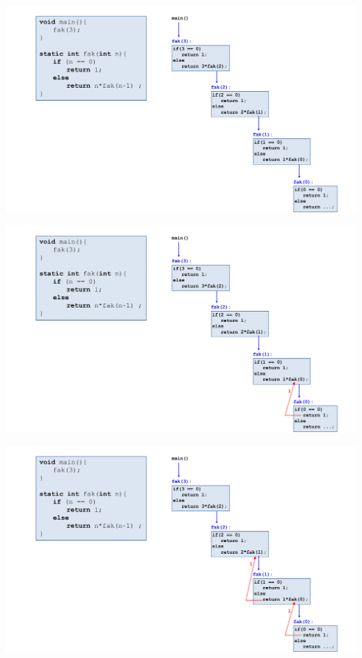 \documentclass{beamer}
\begin{document}
\begin{frame}
    \begin{center}
           \includegraphics[width=1.1\textwidth]{rekursion anlage/07_Rekursion-07.png}
    \end{center}
\end{frame}
\begin{frame}
    \begin{center}
           \includegraphics[width=1.1\textwidth]{rekursion anlage/07_Rekursion-08.png}
    \end{center}
\end{frame}
\begin{frame}
    \begin{center}
           \includegraphics[width=1.1\textwidth]{rekursion anlage/07_Rekursion-09.png}
    \end{center}
\end{frame}
\end{document}
